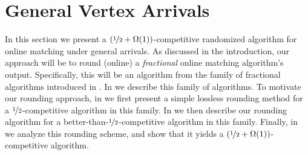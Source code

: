\section{General Vertex Arrivals}\label{sec:vertex}

In this section we present a $(\nicefrac{1}{2}+\Omega(1))$-competitive randomized algorithm for online matching under general arrivals.
As discussed in the introduction, our approach will be to round (online) a \emph{fractional} online matching algorithm's output. Specifically, this will be an algorithm from the family of fractional algorithms introduced in \cite{wang2015two}. In  we describe this family of algorithms. To motivate our rounding approach, in  we first present a simple lossless rounding method for a $\nicefrac{1}{2}$-competitive algorithm in this family. In  we then describe our rounding algorithm for a better-than-$\nicefrac{1}{2}$-competitive algorithm in this family. Finally, in  we analyze this rounding scheme, and show that it yields a $(\nicefrac{1}{2}+\Omega(1))$-competitive algorithm.








